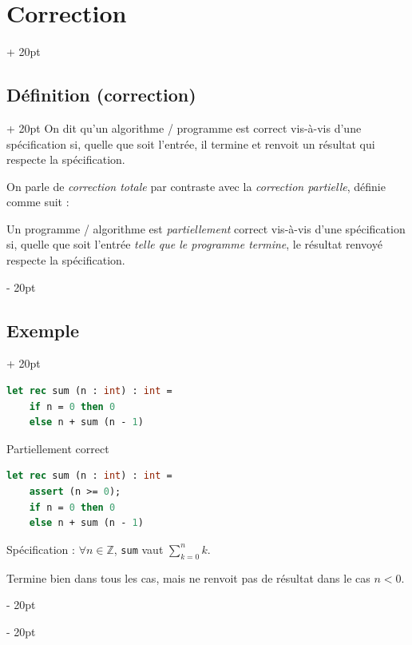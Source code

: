 \documentclass[a4paper, 12pt, twoside]{article}
\newcommand{\Z}{\mathbb{Z}} %
\newcommand{\ind}[1][20pt]{\advance\leftskip + #1}
\newcommand{\deind}[1][20pt]{\advance\leftskip - #1}
\newenvironment{indentedenv}[1][20pt]{\par \ind[#1]}{\par \deind}
\newenvironment{indt}[2][20pt]{#2 \begin{indentedenv}[#1]}{\end{indentedenv}} %
\begin{document}
    \begin{indt}{\section{Correction}}
        
        \begin{indt}{\subsection{Définition (correction)}}
            On dit qu'un algorithme / programme est correct vis-à-vis d'une spécification si, quelle que soit l'entrée, il termine et renvoit un résultat qui respecte la spécification.
            
            \vspace{6pt}
            
            On parle de \textit{correction totale} par contraste avec la \textit{correction partielle}, définie comme suit :
            
            Un programme / algorithme est \textit{partiellement} correct vis-à-vis d'une spécification si, quelle que soit l'entrée \textit{telle que le programme termine}, le résultat renvoyé respecte la spécification.
        \end{indt}
        
        \vspace{6pt}
        
        \begin{indt}{\subsection{Exemple}}
            \begin{lstlisting}[language=Caml, xleftmargin=60pt]
let rec sum (n : int) : int =
    if n = 0 then 0
    else n + sum (n - 1)\end{lstlisting}
            
            Partiellement correct
            
            \begin{lstlisting}[language=Caml, xleftmargin=60pt]
let rec sum (n : int) : int =
    assert (n >= 0);
    if n = 0 then 0
    else n + sum (n - 1)\end{lstlisting}
            
            Spécification : $\forall n \in \Z$, \texttt{sum} vaut $\displaystyle \sum_{k = 0}^n k$.
            
            Termine bien dans tous les cas, mais ne renvoit pas de résultat dans le cas $n < 0$.
        \end{indt}
        

\end{indt}
\end{document}
